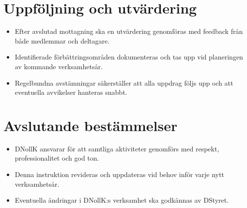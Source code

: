 \documentclass[a4paper]{dtekinstruktion}
\begin{document}
\section{Uppföljning och utvärdering}
\begin{itemize}
  \item Efter avslutad mottagning ska en utvärdering genomföras med feedback från både medlemmar och deltagare.
  \item Identifierade förbättringsområden dokumenteras och tas upp vid planeringen av kommande verksamhetsår.
  \item Regelbundna avstämningar säkerställer att alla uppdrag följs upp och att eventuella avvikelser hanteras snabbt.
\end{itemize}

\section{Avslutande bestämmelser}
\begin{itemize}
  \item DNollK ansvarar för att samtliga aktiviteter genomförs med respekt, professionalitet och god ton.
  \item Denna instruktion revideras och uppdateras vid behov inför varje nytt verksamhetsår.
  \item Eventuella ändringar i DNollK:s verksamhet ska godkännas av DStyret.
\end{itemize}
\end{document}
